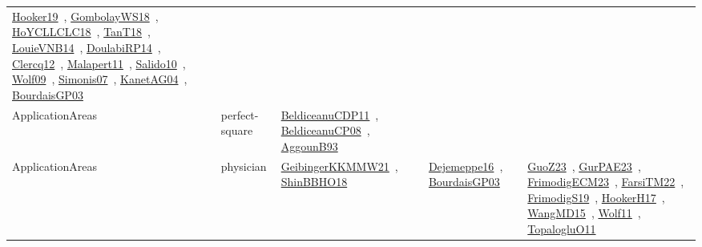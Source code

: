 {\begin{longtable}{lp{3cm}>{\raggedright\arraybackslash}p{6cm}>{\raggedright\arraybackslash}p{6cm}>{\raggedright\arraybackslash}p{8cm}}
\href{../works/Hooker19.pdf}{Hooker19}~\cite{Hooker19}, \href{../works/GombolayWS18.pdf}{GombolayWS18}~\cite{GombolayWS18}, \href{../works/HoYCLLCLC18.pdf}{HoYCLLCLC18}~\cite{HoYCLLCLC18}, \href{../works/TanT18.pdf}{TanT18}~\cite{TanT18}, \href{../works/LouieVNB14.pdf}{LouieVNB14}~\cite{LouieVNB14}, \href{../works/DoulabiRP14.pdf}{DoulabiRP14}~\cite{DoulabiRP14}, \href{../works/Clercq12.pdf}{Clercq12}~\cite{Clercq12}, \href{../works/Malapert11.pdf}{Malapert11}~\cite{Malapert11}, \href{../works/Salido10.pdf}{Salido10}~\cite{Salido10}, \href{../works/Wolf09.pdf}{Wolf09}~\cite{Wolf09}, \href{../works/Simonis07.pdf}{Simonis07}~\cite{Simonis07}, \href{../works/KanetAG04.pdf}{KanetAG04}~\cite{KanetAG04}, \href{../works/BourdaisGP03.pdf}{BourdaisGP03}~\cite{BourdaisGP03}\\
\index{perfect-square}\index{ApplicationAreas!perfect-square}ApplicationAreas & perfect-square & \href{../works/BeldiceanuCDP11.pdf}{BeldiceanuCDP11}~\cite{BeldiceanuCDP11}, \href{../works/BeldiceanuCP08.pdf}{BeldiceanuCP08}~\cite{BeldiceanuCP08}, \href{../works/AggounB93.pdf}{AggounB93}~\cite{AggounB93} &  & \\
\index{physician}\index{ApplicationAreas!physician}ApplicationAreas & physician & \href{../works/GeibingerKKMMW21.pdf}{GeibingerKKMMW21}~\cite{GeibingerKKMMW21}, \href{../works/ShinBBHO18.pdf}{ShinBBHO18}~\cite{ShinBBHO18} & \href{../works/Dejemeppe16.pdf}{Dejemeppe16}~\cite{Dejemeppe16}, \href{../works/BourdaisGP03.pdf}{BourdaisGP03}~\cite{BourdaisGP03} & \href{../works/GuoZ23.pdf}{GuoZ23}~\cite{GuoZ23}, \href{../works/GurPAE23.pdf}{GurPAE23}~\cite{GurPAE23}, \href{../works/FrimodigECM23.pdf}{FrimodigECM23}~\cite{FrimodigECM23}, \href{../works/FarsiTM22.pdf}{FarsiTM22}~\cite{FarsiTM22}, \href{../works/FrimodigS19.pdf}{FrimodigS19}~\cite{FrimodigS19}, \href{../works/HookerH17.pdf}{HookerH17}~\cite{HookerH17}, \href{../works/WangMD15.pdf}{WangMD15}~\cite{WangMD15}, \href{../works/Wolf11.pdf}{Wolf11}~\cite{Wolf11}, \href{../works/TopalogluO11.pdf}{TopalogluO11}~\cite{TopalogluO11}\\

\end{longtable}}
